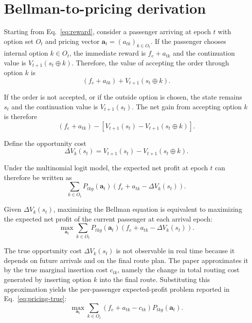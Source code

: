 \documentclass[preprint,12pt,authoryear]{elsarticle}
\begin{document}
\section{Bellman-to-pricing derivation}
\label{app:bellman}

Starting from Eq.~\eqref{eq:reward}, consider a passenger arriving at epoch $t$ with option set $O_t$ and pricing vector $\mathbf{a}_t=(a_{tk})_{k\in O_t}$. If the passenger chooses internal option $k\in O_t$, the immediate reward is $f_e+a_{tk}$ and the continuation value is $V_{t+1}(s_t\oplus k)$. Therefore, the value of accepting the order through option $k$ is
\begin{equation}
\left(f_e+a_{tk}\right) + V_{t+1}(s_t\oplus k).
\tag{B.1}
\end{equation}

If the order is not accepted, or if the outside option is chosen, the state remains $s_t$ and the continuation value is $V_{t+1}(s_t)$. The net gain from accepting option $k$ is therefore
\begin{equation}
\left(f_e+a_{tk}\right) - \left[V_{t+1}(s_t) - V_{t+1}(s_t\oplus k)\right].
\tag{B.2}
\end{equation}

Define the opportunity cost
\begin{equation}
\Delta V_k(s_t) = V_{t+1}(s_t) - V_{t+1}(s_t\oplus k).
\tag{B.3}
\end{equation}

Under the multinomial logit model, the expected net profit at epoch $t$ can therefore be written as
\begin{equation}
\sum_{k\in O_t} P_{tkg}(\mathbf{a}_t)\left(f_e+a_{tk}-\Delta V_k(s_t)\right).
\tag{B.4}
\end{equation}

Given $\Delta V_k(s_t)$, maximizing the Bellman equation is equivalent to maximizing the expected net profit of the current passenger at each arrival epoch:
\begin{equation}
\max_{\mathbf{a}_t}
\sum_{k\in O_t} P_{tkg}(\mathbf{a}_t)\left(f_e+a_{tk}-\Delta V_k(s_t)\right).
\tag{B.5}
\end{equation}

The true opportunity cost $\Delta V_k(s_t)$ is not observable in real time because it depends on future arrivals and on the final route plan. The paper approximates it by the true marginal insertion cost $c_{tk}$, namely the change in total routing cost generated by inserting option $k$ into the final route. Substituting this approximation yields the per-passenger expected-profit problem reported in Eq.~\eqref{eq:pricing-true}:
\begin{equation}
\max_{\mathbf{a}_t}
\sum_{k\in O_t} (f_e+a_{tk}-c_{tk})P_{tkg}(\mathbf{a}_t).
\tag{B.6}
\end{equation}
\end{document}

